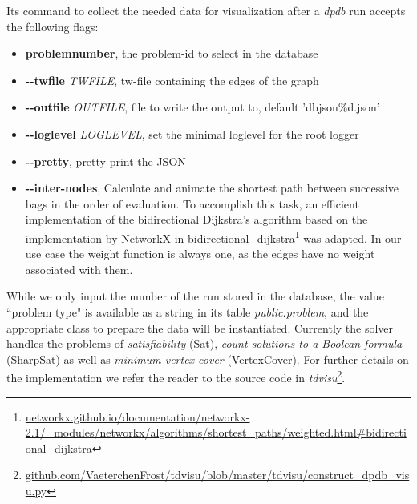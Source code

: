 \documentclass[a4paper, 12pt, bibliography=totoc]{scrartcl}
\begin{document}
Its command to collect the needed data for visualization after a \textit{dpdb} run accepts the following flags:
\begin{itemize}
	\item
	\textbf{problemnumber},
	 the problem-id to select in the database
	 
	\item
	\textbf{-{}-twfile }\textit{TWFILE},
	tw-file containing the edges of the graph 
	
	\item
	\textbf{-{}-outfile }\textit{OUTFILE},
	 file to write the output to, default 'dbjson\%d.json'
	 
	\item
	\textbf{-{}-loglevel }\textit{LOGLEVEL},
	 set the minimal loglevel for the root logger
	 
	\item
	\textbf{-{}-pretty},
	 pretty-print the JSON
	 
	\item
	\textbf{-{}-inter-nodes},
	Calculate and animate the shortest path between successive bags in the order of evaluation. To accomplish this task, an efficient implementation of the bidirectional Dijkstra's algorithm \cite{shortestPathAlgo} based on the implementation by NetworkX \cite{SciPyProceedings_11} in {bidirectional\_dijkstra}\footnote{\url{networkx.github.io/documentation/networkx-2.1/\_modules/networkx/algorithms/shortest\_paths/weighted.html\#bidirectional\_dijkstra}} was adapted.
	In our use case the weight function is always one, as the edges have no weight associated with them.
\end{itemize}

While we only input the number of the run stored in the database, the value ``problem type" is available as a string in its table \emph{public.problem}, and the appropriate class to prepare the data will be instantiated. Currently the solver handles the problems of \textit{satisfiability} (Sat), \textit{count solutions to a Boolean formula} (SharpSat) as well as \textit{minimum vertex cover} (VertexCover).
For further details on the implementation we refer the reader to the source code in \textit{tdvisu}\footnote{\url{github.com/VaeterchenFrost/tdvisu/blob/master/tdvisu/construct_dpdb_visu.py}}.
\end{document}
